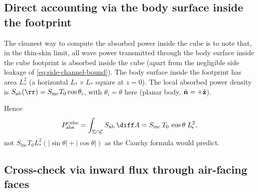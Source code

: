 \documentclass[11pt,a4paper]{article}
\theoremstyle{definition}
\theoremstyle{remark}
\newcommand{\Sab}{S_{\mathrm{ab}}}
\newcommand{\Sinc}{S_{\mathrm{inc}}}
\newcommand{\Tzero}{T_0}
\newcommand{\Lact}{L_{\!*}}
\begin{document}
\subsection{Direct accounting via the body surface inside the footprint}

The cleanest way to compute the absorbed power inside the cube is to
note that, in the thin-skin limit, all wave power transmitted through
the body surface inside the cube footprint is absorbed inside the
cube (apart from the negligible side leakage of
\cref{eq:side-channel-bound}). The body surface inside the footprint
has area $\Lact^2$ (a horizontal $\Lact\times\Lact$ square at
$z=0$). The local absorbed power density is
$\Sab(\rr)=\Sinc\Tzero\cos\theta_i$, with $\theta_i=\theta$ here
(planar body, $\hat{\vb n}=+\hat{\vb z}$).

Hence
\begin{equation}\label{eq:correct-Pabs}
  P_{\mathrm{abs}}^{\mathrm{cube}}
  = \int_{\Sigma\cap\mathcal{C}} \Sab\,\diff A
  = \Sinc\,\Tzero\,\cos\theta\;\Lact^2,
\end{equation}
not $\Sinc\Tzero\Lact^2(|\sin\theta|+|\cos\theta|)$ as the Cauchy
formula would predict.

\subsection{Cross-check via inward flux through air-facing faces}
\end{document}
